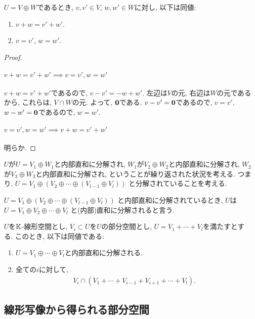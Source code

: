 \begin{prop}
  $U=V\oplus W$であるとき,
  $v,v'\in V$,
  $w,w'\in W$に対し, 以下は同値:
  \begin{enumerate}
  \item $v+w=v'+w'$.
  \item $v=v'$, $w=w'$.
  \end{enumerate}
\end{prop}
\begin{proof}
  \paragraph{$v+w=v'+w'\implies v=v', w=w'$}
  $v+w=v'+w'$であるので,
  $v-v'=-w+w'$.
  左辺は$V$の元, 右辺は$W$の元であるから,
  これらは, $V\cap W$の元.
  よって, $\boldsymbol{0}$である.
  $v-v'=\boldsymbol{0}$であるので, $v=v'$.
  $w-w'=\boldsymbol{0}$であるので, $w=w'$.
  \paragraph{$v=v', w=w'\implies v+w=v'+w'$}
  明らか.
\end{proof}


$U$が$U=V_1\oplus W_1$と内部直和に分解され,
$W_1$が$V_2\oplus W_2$と内部直和に分解され,
$W_2$が$V_3\oplus W_3$と内部直和に分解され,
ということが繰り返された状況を考える.
つまり,
$U=V_1\oplus (V_2\oplus \cdots \oplus(V_{l-1}\oplus V_l))$
と分解されていることを考える.
\begin{definition}
$U=V_1\oplus (V_2\oplus \cdots \oplus(V_{l-1}\oplus V_l))$
と内部直和に分解されているとき,
$U$は$U=V_1\oplus V_2\oplus \cdots \oplus V_l$
と(内部)直和に分解されると言う.
\end{definition}
\begin{prop}
  $U$を$\mathbb{K}$-線形空間とし, $V_i\subset U$を$U$の部分空間とし,
  $U=V_1+\cdots+ V_l$を満たすとする.
  このとき, 以下は同値である:
  \begin{enumerate}
  \item $U=V_1\oplus \cdots \oplus V_l$と内部直和に分解される.
  \item 全ての$i$に対して,
    \begin{align*}
      V_i \cap (V_1+\cdots+ V_{i-1}+V_{i+1}+\cdots+ V_{l}).
    \end{align*}
  \end{enumerate}
\end{prop}

\subsection{線形写像から得られる部分空間}

